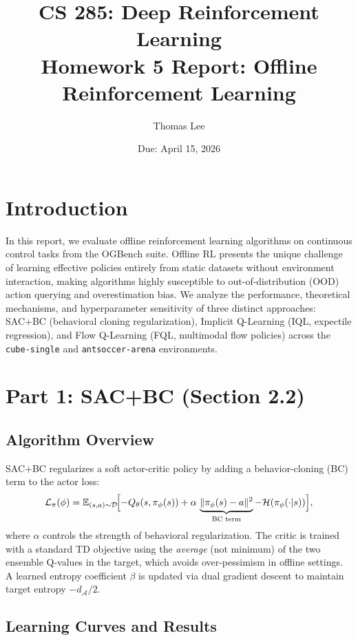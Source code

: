 \documentclass{article}
\title{CS 285: Deep Reinforcement Learning \\ Homework 5 Report: Offline Reinforcement Learning}
\author{Thomas Lee}
\date{Due: April 15, 2026}
\begin{document}
\maketitle
\tableofcontents

\section{Introduction}
In this report, we evaluate offline reinforcement learning algorithms on continuous control tasks from the OGBench suite. Offline RL presents the unique challenge of learning effective policies entirely from static datasets without environment interaction, making algorithms highly susceptible to out-of-distribution (OOD) action querying and overestimation bias. We analyze the performance, theoretical mechanisms, and hyperparameter sensitivity of three distinct approaches: SAC+BC (behavioral cloning regularization), Implicit Q-Learning (IQL, expectile regression), and Flow Q-Learning (FQL, multimodal flow policies) across the \texttt{cube-single} and \texttt{antsoccer-arena} environments.

\newpage

\section{Part 1: SAC+BC (Section 2.2)}

\subsection{Algorithm Overview}

SAC+BC \cite{td3bc} regularizes a soft actor-critic policy by adding a behavior-cloning (BC) term to the actor loss:
\[
  \mathcal{L}_\pi(\phi)
  = \mathbb{E}_{(s,a)\sim\mathcal{D}}\!\Bigl[
      -Q_\theta(s, \pi_\phi(s))
      + \alpha \,\underbrace{\|\pi_\phi(s) - a\|^2}_{\text{BC term}}
      - \mathcal{H}(\pi_\phi(\cdot|s))
    \Bigr],
\]
where $\alpha$ controls the strength of behavioral regularization. The critic is trained with a standard TD objective using the \emph{average} (not minimum) of the two ensemble Q-values in the target, which avoids over-pessimism in offline settings. A learned entropy coefficient $\beta$ is updated via dual gradient descent to maintain target entropy $-d_\mathcal{A}/2$.

\subsection{Learning Curves and Results}
\end{document}
